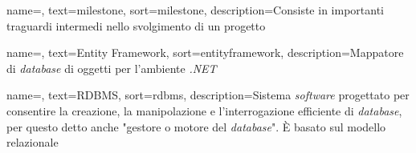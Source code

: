{
    name=,
    text=milestone,
    sort=milestone,
    description={Consiste in importanti traguardi intermedi nello svolgimento di un progetto}
}

{
    name=,
    text=Entity Framework,
    sort=entityframework,
    description={Mappatore di \textit{database} di oggetti per l'ambiente \textit{.NET} \cite{site:entity-framework-docs}}
}

{
    name=,
    text=RDBMS,
    sort=rdbms,
    description={Sistema \textit{software} progettato per consentire la creazione, la manipolazione e l'interrogazione efficiente di \textit{database}, per questo detto anche "gestore o motore del \textit{database}". È basato sul modello relazionale \cite{site:wiki}}
}